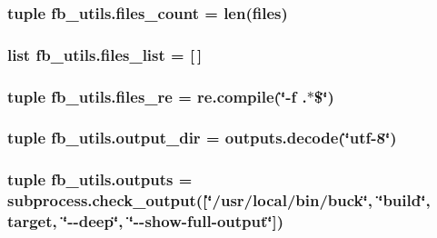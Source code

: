\hypertarget{namespacefb__utils_a711f7adf2968e603be09e31a7a2dc090}{
\subsubsection[{files\-\_\-count}]{\setlength{\rightskip}{0pt plus 5cm}tuple fb\-\_\-utils.\-files\-\_\-count = len({\bf files})}}\label{namespacefb__utils_a711f7adf2968e603be09e31a7a2dc090}
\hypertarget{namespacefb__utils_abfa8ee516782c6f0fc32b4407b807f65}{
\subsubsection[{files\-\_\-list}]{\setlength{\rightskip}{0pt plus 5cm}list fb\-\_\-utils.\-files\-\_\-list = \mbox{[}$\,$\mbox{]}}}\label{namespacefb__utils_abfa8ee516782c6f0fc32b4407b807f65}
\hypertarget{namespacefb__utils_aeede718a07634cd31cd013fae69a9722}{
\subsubsection[{files\-\_\-re}]{\setlength{\rightskip}{0pt plus 5cm}tuple fb\-\_\-utils.\-files\-\_\-re = re.\-compile(\char`\"{}-\/f .$\ast$\$\char`\"{})}}\label{namespacefb__utils_aeede718a07634cd31cd013fae69a9722}
\hypertarget{namespacefb__utils_a2c908403428ebd5029f8d92d48d5d514}{
\subsubsection[{output\-\_\-dir}]{\setlength{\rightskip}{0pt plus 5cm}tuple fb\-\_\-utils.\-output\-\_\-dir = outputs.\-decode(\char`\"{}utf-\/8\char`\"{})}}\label{namespacefb__utils_a2c908403428ebd5029f8d92d48d5d514}
\hypertarget{namespacefb__utils_a0462d4018caf2858ea278a67705d8073}{
\subsubsection[{outputs}]{\setlength{\rightskip}{0pt plus 5cm}tuple fb\-\_\-utils.\-outputs = subprocess.\-check\-\_\-output(\mbox{[}\char`\"{}/usr/local/bin/buck\char`\"{}, \char`\"{}build\char`\"{}, target, \char`\"{}-\/-\/deep\char`\"{}, \char`\"{}-\/-\/show-\/full-\/output\char`\"{}\mbox{]})}}\label{namespacefb__utils_a0462d4018caf2858ea278a67705d8073}
